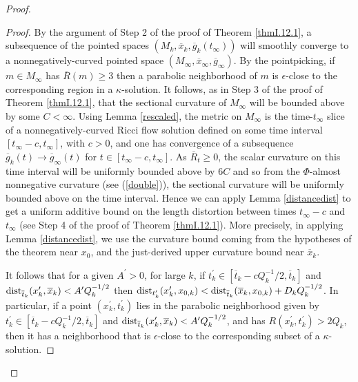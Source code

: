 \begin{proof}
\begin{proof}
By the argument of Step 2 of the proof of Theorem \ref{thmI.12.1},
a subsequence of the
pointed spaces $(M_k, \overline{x}_k, \overline{g}_k({t}_\infty))$
will smoothly converge to a nonnegatively-curved pointed space $(M_\infty,
\overline{x}_\infty,\overline{g}_\infty)$.
By the pointpicking, if $m \in M_\infty$ has $\overline{R}(m) \ge 3$
then a parabolic neighborhood of $m$ is $\epsilon$-close
to the corresponding region in a $\kappa$-solution.
It follows,
as in Step 3 of the proof of Theorem
\ref{thmI.12.1}, that the sectional curvature of $M_\infty$ will be bounded above by
some $C < \infty$. Using Lemma \ref{rescaled}, the metric on
$M_\infty$ is the time-$t_\infty$ slice of
a nonnegatively-curved Ricci flow solution defined on some time interval
$[t_\infty - c , t_\infty]$, with $c > 0$,
and one has convergence of a subsequence $\overline{g}_k(t)
\rightarrow \overline{g}_\infty(t)$ for $t \in [t_\infty - c , t_\infty]$.
As $\overline{R}_t \ge 0$, the scalar curvature on this time interval
will be uniformly bounded above by $6C$ and so from  the
$\Phi$-almost nonnegative curvature (see (\ref{double})), the
sectional curvature will be uniformly bounded above on the time interval.
Hence we can apply Lemma \ref{distancedist} to get a uniform additive bound on the
length
distortion between times $t_\infty - c$ and $t_\infty$ (see Step 4 of the
proof of Theorem \ref{thmI.12.1}). More precisely, in applying Lemma
\ref{distancedist}, we
use the curvature bound coming from the hypotheses of the theorem near
$x_0$, and the just-derived upper curvature bound near $\overline{x}_k$.

It follows that for a given $A^\prime > 0$, for large
$k$, if $t_k^\prime \in [\overline{t}_k - c Q_k^{-1}/2, \overline{t}_k]$ and
$\operatorname{dist}_{\overline{t}_k}(x_k^\prime, \overline{x}_k) < A^\prime Q_k^{-1/2}$
then $\operatorname{dist}_{t^\prime_k}(x^\prime_k, {x}_{0,k})
< \operatorname{dist}_{\overline{t}_k}(\overline{x}_k,
x_{0,k}) +
D_k Q_k^{-1/2}$. In particular, if a point
$(x_k^\prime, t_k^\prime)$ lies in the
parabolic neighborhood given by
$t_k^\prime \in [\overline{t}_k - c Q_k^{-1}/2, \overline{t}_k]$ and
$\operatorname{dist}_{\overline{t}_k}(x_k^\prime, \overline{x}_k) < A^\prime Q_k^{-1/2}$,
and  has
$R(x_k^\prime, t_k^\prime) > 2Q_k$, then it has a neighborhood that
is $\epsilon$-close to the corresponding subset of a $\kappa$-solution.


\end{proof}
\end{proof}
